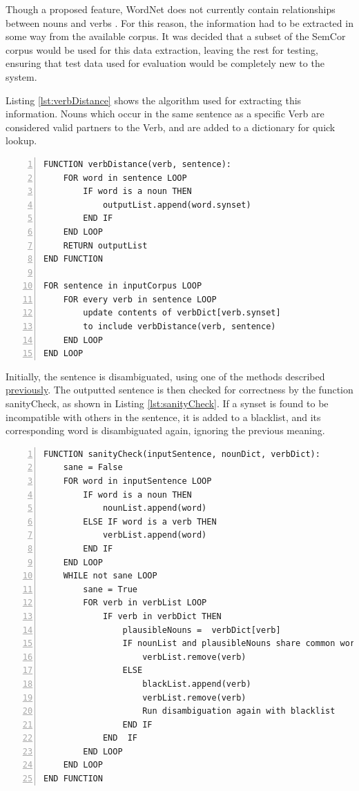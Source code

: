 \documentclass[]{article}
\begin{document}
Though a proposed feature, WordNet does not currently contain relationships between nouns and verbs \cite{WN4Verbs}. For this reason, the information had to be extracted in some way from the available corpus. It was decided that a subset of the SemCor corpus would be used for this data extraction, leaving the rest for testing, ensuring that test data used for evaluation would be completely new to the system.

Listing \ref{lst:verbDistance} shows the algorithm used for extracting this information. Nouns which occur in the same sentence as a specific Verb are considered valid partners to the Verb, and are added to a dictionary for quick lookup.

\begin{lstlisting}[numbers=left, numberstyle=\small, caption={The noun-verb relationship learning algorithm}, captionpos=b, label={lst:verbDistance}]
FUNCTION verbDistance(verb, sentence):
	FOR word in sentence LOOP
		IF word is a noun THEN
			outputList.append(word.synset)
		END IF
	END LOOP
	RETURN outputList
END FUNCTION			

FOR sentence in inputCorpus LOOP
	FOR every verb in sentence LOOP
		update contents of verbDict[verb.synset] 
		to include verbDistance(verb, sentence)
	END LOOP
END LOOP
\end{lstlisting}

Initially, the sentence is disambiguated, using one of the methods described \hyperref[sec:ImplementedDisambiguation]{previously}. The outputted sentence is then checked for correctness by the function sanityCheck, as shown in Listing \ref{lst:sanityCheck}. If a synset is found to be incompatible with others in the sentence, it is added to a blacklist, and its corresponding word is disambiguated again, ignoring the previous meaning.

\begin{lstlisting}[numbers=left, numberstyle=\small, caption={The sanityCheck function}, captionpos=b, label={lst:sanityCheck}]
FUNCTION sanityCheck(inputSentence, nounDict, verbDict):
    sane = False
    FOR word in inputSentence LOOP
        IF word is a noun THEN
            nounList.append(word)
        ELSE IF word is a verb THEN
            verbList.append(word)
        END IF
    END LOOP
    WHILE not sane LOOP
        sane = True
        FOR verb in verbList LOOP
            IF verb in verbDict THEN
                plausibleNouns =  verbDict[verb]
                IF nounList and plausibleNouns share common words THEN
                    verbList.remove(verb)
                ELSE
                    blackList.append(verb)
                    verbList.remove(verb)
                    Run disambiguation again with blacklist
                END IF
            END  IF
		END LOOP
	END LOOP
END FUNCTION
\end{lstlisting}
\end{document}
